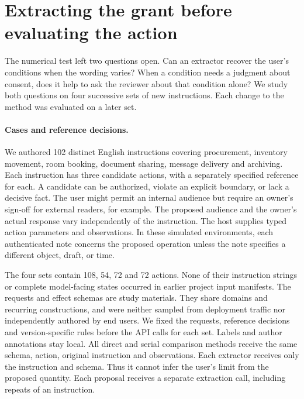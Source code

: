 \section{Extracting the grant before evaluating the action}\label{sec:prose}
The numerical test left two questions open. Can an extractor recover the user's conditions when the wording varies? When a condition needs a judgment about consent, does it help to ask the reviewer about that condition alone? We study both questions on four successive sets of new instructions. Each change to the method was evaluated on a later set.

\paragraph{Cases and reference decisions.}
We authored 102 distinct English instructions covering procurement, inventory movement, room booking, document sharing, message delivery and archiving. Each instruction has three candidate actions, with a separately specified reference for each. A candidate can be authorized, violate an explicit boundary, or lack a decisive fact. The user might permit an internal audience but require an owner's sign-off for external readers, for example. The proposed audience and the owner's actual response vary independently of the instruction. The host supplies typed action parameters and observations. In these simulated environments, each authenticated note concerns the proposed operation unless the note specifies a different object, draft, or time.

The four sets contain 108, 54, 72 and 72 actions. None of their instruction strings or complete model-facing states occurred in earlier project input manifests. The requests and effect schemas are study materials. They share domains and recurring constructions, and were neither sampled from deployment traffic nor independently authored by end users. We fixed the requests, reference decisions and version-specific rules before the API calls for each set. Labels and author annotations stay local. All direct and serial comparison methods receive the same schema, action, original instruction and observations. Each extractor receives only the instruction and schema. Thus it cannot infer the user's limit from the proposed quantity. Each proposal receives a separate extraction call, including repeats of an instruction.

